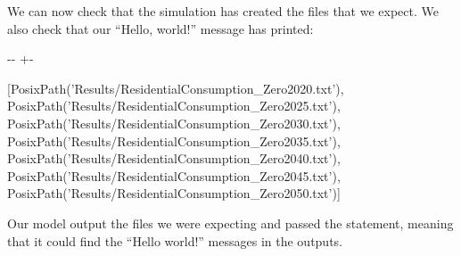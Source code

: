 \documentclass[letterpaper,10pt,english]{sphinxmanual}
\newlength\nbsphinxcodecellspacing
\begin{document}
We can now check that the simulation has created the files that we expect. We also check that our “Hello, world!” message has printed:

{
\begin{sphinxVerbatim}[commandchars=\\\{\}]
\llap{\color{nbsphinxin}[5]:\,\hspace{\fboxrule}\hspace{\fboxsep}}    
   \PYG{p}{[}\PYG{p}{]}
\end{sphinxVerbatim}
}

{

\kern-\sphinxverbatimsmallskipamount\kern-\baselineskip
\kern+\FrameHeightAdjust\kern-\fboxrule
\vspace{\nbsphinxcodecellspacing}

\begin{sphinxVerbatim}[commandchars=\\\{\}]
\llap{\color{nbsphinxout}[5]:\,\hspace{\fboxrule}\hspace{\fboxsep}}[PosixPath('Results/ResidentialConsumption\_Zero2020.txt'),
 PosixPath('Results/ResidentialConsumption\_Zero2025.txt'),
 PosixPath('Results/ResidentialConsumption\_Zero2030.txt'),
 PosixPath('Results/ResidentialConsumption\_Zero2035.txt'),
 PosixPath('Results/ResidentialConsumption\_Zero2040.txt'),
 PosixPath('Results/ResidentialConsumption\_Zero2045.txt'),
 PosixPath('Results/ResidentialConsumption\_Zero2050.txt')]
\end{sphinxVerbatim}
}

Our model output the files we were expecting and passed the  statement, meaning that it could find the “Hello world!” messages in the outputs.
\end{document}
